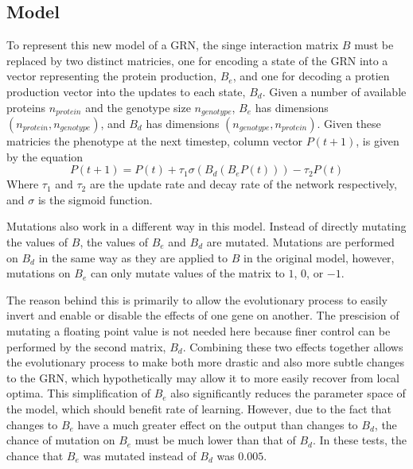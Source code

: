 \documentclass[twocolumn,a4paper,12pt]{article}
\begin{document}
    \subsection{Model}
    To represent this new model of a GRN, the singe interaction matrix $B$ must be replaced by two distinct matricies, one for encoding a state of the GRN into a vector representing the protein production, $B_e$, and one for decoding a protien production vector into the updates to each state, $B_d$. Given a number of available proteins $n_{protein}$ and the genotype size $n_{genotype}$, $B_e$ has dimensions $(n_{protein},n_{genotype})$, and $B_d$ has dimensions $(n_{genotype},n_{protein})$. Given these matricies the phenotype at the next timestep, column vector $P(t+1)$, is given by the equation
    \begin{equation}
        P(t+1) = P(t) + \tau_1 \sigma (B_d (B_e P(t))) - \tau_2 P(t)
    \end{equation}
    Where $\tau_1$ and $\tau_2$ are the update rate and decay rate of the network respectively, and $\sigma$ is the sigmoid function.

    Mutations also work in a different way in this model. Instead of directly mutating the values of $B$, the values of $B_e$ and $B_d$ are mutated. Mutations are performed on $B_d$ in the same way as they are applied to $B$ in the original model, however, mutations on $B_e$ can only mutate values of the matrix to $1$, $0$, or $-1$.
    
    The reason behind this is primarily to allow the evolutionary process to easily invert and enable or disable the effects of one gene on another. The prescision of mutating a floating point value is not needed here because finer control can be performed by the second matrix, $B_d$. Combining these two effects together allows the evolutionary process to make both more drastic and also more subtle changes to the GRN, which hypothetically may allow it to more easily recover from local optima. This simplification of $B_e$ also significantly reduces the parameter space of the model, which should benefit rate of learning. However, due to the fact that changes to $B_e$ have a much greater effect on the output than changes to $B_d$, the chance of mutation on $B_e$ must be much lower than that of $B_d$. In these tests, the chance that $B_e$ was mutated instead of $B_d$ was $0.005$.
\end{document}
